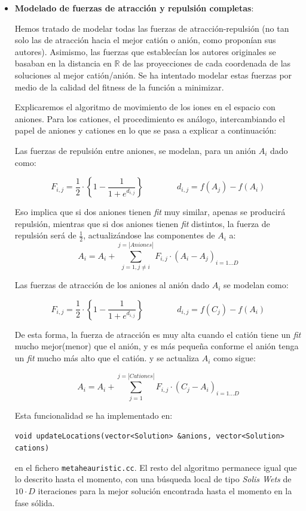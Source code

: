 \documentclass[a4paper,11pt]{article}
\begin{document}
\begin{itemize}
\begin{itemize}
 \end{itemize}
 
 \item \textbf{Modelado de fuerzas de atracción y repulsión completas}:
 
 Hemos tratado de modelar todas las fuerzas de atracción-repulsión (no tan solo las de atracción hacia
 el mejor catión o anión, como proponían sus autores). Asimismo, las fuerzas que establecían los autores
 originales se basaban en la distancia en $\mathbb{R}$ de las proyecciones de cada coordenada de las soluciones
 al mejor catión/anión. Se ha intentado modelar estas fuerzas por medio de la calidad del fitness de la función
 a minimizar. 
 
 Explicaremos el algoritmo de movimiento de los iones en el espacio con aniones. Para los cationes, el procedimiento es
 análogo, intercambiando el papel de aniones y cationes en lo que se pasa a explicar a continuación:
 
 Las fuerzas de repulsión entre aniones, se modelan, para un anión $A_i$ dado como:
 
 $$F_{i,j} = \frac{1}{2} \cdot \left\{1-\frac{1}{1+e^{d_{i,j}}}\right\} \qquad \qquad d_{i,j} = {f(A_j) - f(A_i)}$$ 
 
 Eso implica que si dos aniones tienen \textit{fit} muy similar, apenas se producirá repulsión, mientras que si dos
 aniones tienen \textit{fit} distintos, la fuerza de repulsión será de $\frac{1}{2}$, actualizándose las componentes de $A_i$
 a:
  $$A_i = A_i + \sum_{j=1, j\neq i}^{j=|Aniones|} F_{i,j}\cdot (A_i - A_j)_{i=1\ldots D}$$
  
 Las fuerzas de atracción de los aniones al anión dado $A_i$ se modelan como:
 
 $$F_{i,j} = \frac{1}{2} \cdot \left\{1-\frac{1}{1+e^{d_{i,j}}}\right\} \qquad \qquad d_{i,j} = {f(C_j) - f(A_i)}$$ 

 De esta forma, la fuerza de atracción es muy alta cuando el catión tiene un \textit{fit} mucho mejor(menor) que el anión, y
 es más pequeña conforme el anión tenga un \textit{fit} mucho más alto que el catión.
 y se actualiza $A_i$ como sigue:
 
 $$A_i = A_i + \sum_{j=1}^{j=|Cationes|} F_{i,j}\cdot (C_j - A_i)_{i=1\ldots D}$$
 
 Esta funcionalidad se ha implementado en:
 
 \texttt{void updateLocations(vector<Solution> \&anions, vector<Solution> cations)}
 
 en el fichero \texttt{metaheauristic.cc}. El resto del algoritmo permanece igual que lo descrito hasta el momento, con una búsqueda
 local de tipo \textit{Solis Wets} de $10\cdot D$ iteraciones para la mejor solución encontrada hasta el momento en la fase sólida.
 

\end{itemize}
\end{document}
